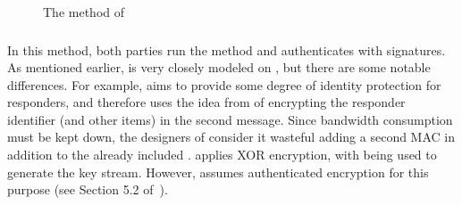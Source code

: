 \begin{figure}[!h]
{}
\caption{The \mStatSig{} method of \mEdhoc}
\label{fig:edhocstatsig}
\end{figure}

\spacehack
\subsubsection{\mSigSig{}}
In this method, both parties run the \mSig{} method and authenticates with signatures.
%
As mentioned earlier, \mSigSig{} is very closely modeled on \mSigmaI{}, but there are some notable differences.
%
For example, \mEdhoc{} aims to provide some degree of identity protection for responders, and therefore uses the idea from \mSigmaI{} of encrypting the responder identifier \mIdcredr{} (and other items) in the second message.
%
Since bandwidth consumption must be kept down, the designers of \mEdhoc{} consider it wasteful adding a second MAC in addition to the already included \mMactwo{}.
%
\mEdhoc{} applies XOR encryption, with \mHkdf{} being used to generate the key stream.
%
However, \mSigma{} assumes authenticated encryption for this purpose (see Section 5.2 of~\cite{sigma}). 
%


